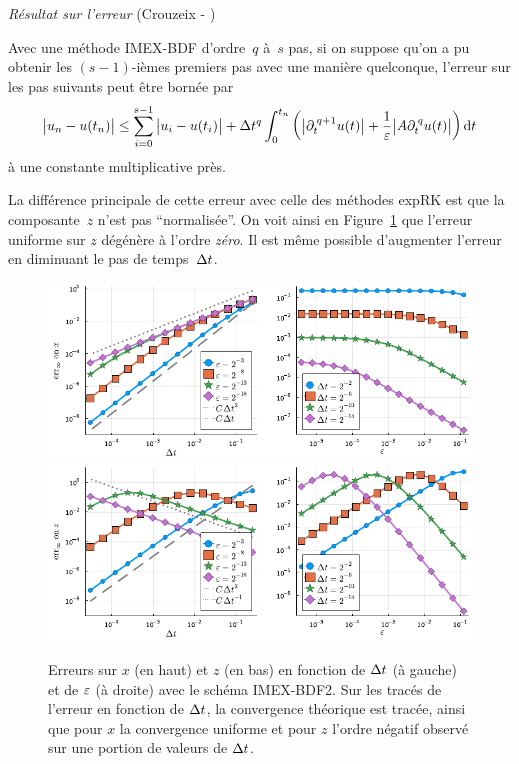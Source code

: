 \bigskip\noindent%
\textit{Résultat sur l'erreur} (Crouzeix - \cite{crouzeix.1980.methode})

Avec une méthode IMEX-BDF d'ordre~$q$ à~$s$ pas, si on suppose qu'on a pu obtenir les $(s-1)$-ièmes premiers pas avec une manière quelconque, l'erreur sur les pas suivants peut être bornée par 
\begin{equation*}
    \big| u_n - u(t_n) \big| \leq
    \sum_{i = 0}^{s-1} \big| u_i - u(t_i) \big|
    + \Delta t^q \int_0^{t_n} \left( 
        \big| \partial_t^{\: q+1} u(t) \big| 
        + \frac{1}{\varepsilon} \big| A \partial_t^{\: q} u(t) \big| 
    \right) \mathrm{d} t 
\end{equation*}
à une constante multiplicative près.

\medskip
La différence principale de cette erreur avec celle des méthodes expRK est que la composante~$z$ n'est pas \enquote{normalisée}. On voit ainsi en Figure~\ref{sec:intro:fig:bdf2} que l'erreur uniforme sur $z$ dégénère à l'ordre \textit{zéro}. Il est même possible d'augmenter l'erreur en diminuant le pas de temps~$\Delta t$. 

\begin{figure}[!h]
    \centering
    \includegraphics[width=\textwidth]{./Presentation/bdf2_err_x.pdf}
    \includegraphics[width=\textwidth]{./Presentation/bdf2_err_z.pdf}
    \caption{Erreurs sur $x$ (en haut) et $z$ (en bas) en fonction de $\Delta t$ (à gauche) et de $\varepsilon$ (à droite) avec le schéma IMEX-BDF2. Sur les tracés de l'erreur en fonction de $\Delta t$, la convergence théorique est tracée, ainsi que pour $x$ la convergence uniforme et pour $z$ l'ordre négatif observé sur une portion de valeurs de $\Delta t$.}
    \label{sec:intro:fig:bdf2}
\end{figure}

